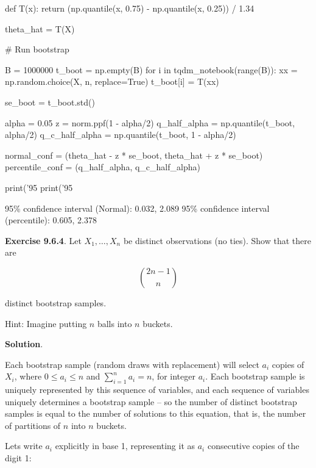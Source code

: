 \begin{python}
def T(x):
    return (np.quantile(x, 0.75) - np.quantile(x, 0.25)) / 1.34
\end{python}

\begin{python}
theta_hat = T(X)
\end{python}

\begin{python}
# Run bootstrap

B = 1000000
t_boot = np.empty(B)
for i in tqdm_notebook(range(B)):
    xx = np.random.choice(X, n, replace=True)
    t_boot[i] = T(xx)
    
se_boot = t_boot.std()

alpha = 0.05
z = norm.ppf(1 - alpha/2)
q_half_alpha = np.quantile(t_boot, alpha/2)
q_c_half_alpha = np.quantile(t_boot, 1 - alpha/2)

normal_conf = (theta_hat - z * se_boot, theta_hat + z * se_boot)
percentile_conf = (q_half_alpha, q_c_half_alpha)

print('95%
print('95%
\end{python}


\begin{console}
95\% confidence interval (Normal):        0.032, 2.089
95\% confidence interval (percentile):    0.605, 2.378
\end{console}

\textbf{Exercise 9.6.4}. Let \(X_1, \dots, X_n\) be distinct
observations (no ties). Show that there are

\[ \binom{2n - 1}{n}\]

distinct bootstrap samples.

Hint: Imagine putting \(n\) balls into \(n\) buckets.

\textbf{Solution}.

Each bootstrap sample (random draws with replacement) will select
\(a_i\) copies of \(X_i\), where \(0 \leq a_i \leq n\) and
\(\sum_{i=1}^n a_i = n\), for integer \(a_i\). Each bootstrap sample is
uniquely represented by this sequence of variables, and each sequence of
variables uniquely determines a bootstrap sample -- so the number of
distinct bootstrap samples is equal to the number of solutions to this
equation, that is, the number of partitions of \(n\) into \(n\) buckets.

Lets write \(a_i\) explicitly in base 1, representing it as \(a_i\)
consecutive copies of the digit 1:

